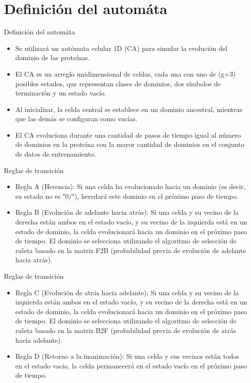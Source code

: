 \documentclass{beamer}
\begin{document}
\section{Definición del automáta}
\begin{frame}{Definición del automáta}
\begin{itemize}
    \item Se utilizará un autómata celular 1D (CA) para simular la evolución del dominio de las proteínas.
    \item El CA es un arreglo unidimensional de celdas, cada una con uno de (g+3) posibles estados, que representan clases de dominios, dos símbolos de terminación y un estado vacío.
    \item Al inicializar, la celda central se establece en un dominio ancestral, mientras que las demás se configuran como vacías.
    \item El CA evoluciona durante una cantidad de pasos de tiempo igual al número de dominios en la proteína con la mayor cantidad de dominios en el conjunto de datos de entrenamiento.
\end{itemize}
\end{frame}

\begin{frame}{Reglas de transición}
\begin{itemize}
    \item Regla A (Herencia): Si una celda ha evolucionado hacia un dominio (es decir, su estado no es "0/"), heredará este dominio en el próximo paso de tiempo.
    \item Regla B (Evolución de adelante hacia atrás): Si una celda y su vecino de la derecha están ambos en el estado vacío, y su vecino de la izquierda está en un estado de dominio, la celda evolucionará hacia un dominio en el próximo paso de tiempo. El dominio se selecciona utilizando el algoritmo de selección de ruleta basado en la matriz F2B (probabilidad previa de evolución de adelante hacia atrás).

\end{itemize}
\end{frame}

\begin{frame}{Reglas de transición}
\begin{itemize}
    \item Regla C (Evolución de atrás hacia adelante): Si una celda y su vecino de la izquierda están ambos en el estado vacío, y su vecino de la derecha está en un estado de dominio, la celda evolucionará hacia un dominio en el próximo paso de tiempo. El dominio se selecciona utilizando el algoritmo de selección de ruleta basado en la matriz B2F (probabilidad previa de evolución de atrás hacia adelante).

    \item Regla D (Retorno a la inanimación): Si una celda y sus vecinos están todos en el estado   vacío, la celda permanecerá en el estado vacío en el próximo paso de tiempo.
\end{itemize}
\end{frame}
\end{document}
